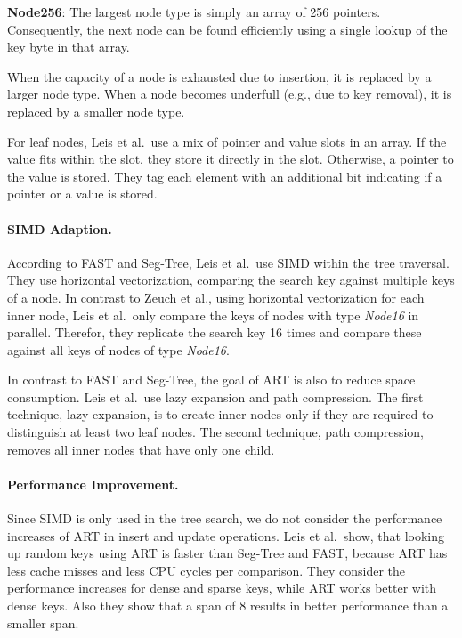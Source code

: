 \documentclass[runningheads,a4paper]{llncs}
\begin{document}
\textbf{Node256}: The largest node type is simply an array of 256 pointers. Consequently, the next node can be found efficiently using a single lookup of the key byte in that array. 

\noindent When the capacity of a node is exhausted due to insertion, it is replaced by a larger node type. When a node becomes underfull (e.g., due to key removal), it is replaced by a smaller node type.

For leaf nodes, Leis et al.\ use a mix of pointer and value slots in an array. If the value fits within the slot, they store it directly in the slot. Otherwise, a pointer to the value is stored. They tag each element with an additional bit indicating if a pointer or a value is stored.


\paragraph{SIMD Adaption.}
According to FAST and Seg-Tree, Leis et al.\ use SIMD within the tree traversal. They use horizontal vectorization, comparing the search key against multiple keys of a node. In contrast to Zeuch et al., using horizontal vectorization for each inner node, Leis et al.\ only compare the keys of nodes with type \emph{Node16} in parallel. Therefor, they replicate the search key 16 times and compare these against all keys of nodes of type \emph{Node16}.

In contrast to FAST and Seg-Tree, the goal of ART is also to reduce space consumption. Leis et al.\ use lazy expansion and path compression. The first technique, lazy expansion, is to create inner nodes only if they are required to distinguish at least two leaf nodes. The second technique, path compression, removes all inner nodes that have only one child.


\paragraph{Performance Improvement.}
Since SIMD is only used in the tree search, we do not consider the performance increases of ART in insert and update operations. Leis et al.\ show, that looking up random keys using ART is faster than Seg-Tree and FAST, because ART has less cache misses and less CPU cycles per comparison. They consider the performance increases for dense and sparse keys, while ART works better with dense keys. Also they show that a span of 8 results in better performance than a smaller span. 
\end{document}
